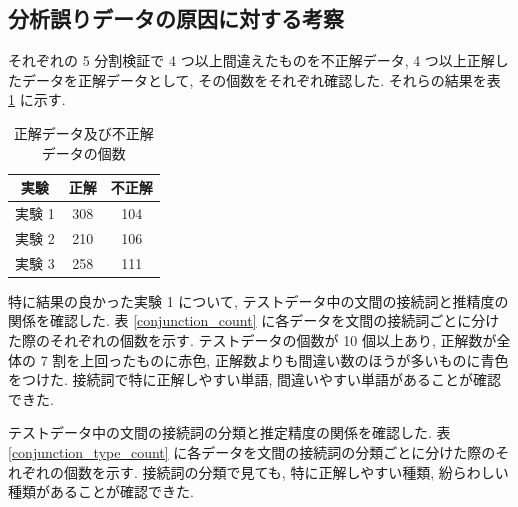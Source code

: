 \documentclass[twocolumn]{jarticle}     %
\begin{document}
\subsection{分析誤りデータの原因に対する考察}
それぞれの 5 分割検証で 4 つ以上間違えたものを不正解データ,
4 つ以上正解したデータを正解データとして, その個数をそれぞれ確認した.
それらの結果を表 \ref{goodmiss} に示す.
\begin{table}[ht] %
	\begin{center}
		\caption{正解データ及び不正解データの個数}
		\label{goodmiss}
		\begin{tabular}{|c|c|c|}
			\hline
			実験   &正解 & 不正解 \\ \hline \hline
			実験 1   & 308 & 104  \\ \hline
			実験 2   & 210 & 106  \\ \hline
			実験 3   & 258 & 111  \\ \hline
		\end{tabular}
	\end{center}
\end{table}
\par
特に結果の良かった実験 1 について, テストデータ中の文間の接続詞と推精度の関係を確認した.
表 \ref{conjunction_count} に各データを文間の接続詞ごとに分けた際のそれぞれの個数を示す.
テストデータの個数が 10 個以上あり, 正解数が全体の 7 割を上回ったものに赤色, 正解数よりも間違い数のほうが多いものに青色をつけた.
接続詞で特に正解しやすい単語, 間違いやすい単語があることが確認できた. \par
テストデータ中の文間の接続詞の分類と推定精度の関係を確認した.
表 \ref{conjunction_type_count} に各データを文間の接続詞の分類ごとに分けた際のそれぞれの個数を示す.
接続詞の分類で見ても, 特に正解しやすい種類, 紛らわしい種類があることが確認できた. \par
\end{document}
